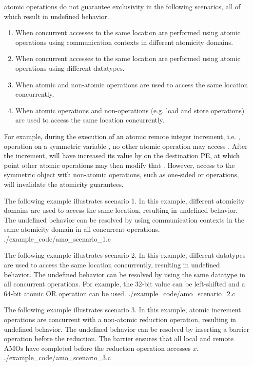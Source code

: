 \openshmem atomic operations do not guarantee exclusivity in the following
scenarios, all of which result in undefined behavior.
\begin{enumerate}
    \item When concurrent accesses to the same location are performed using
        \openshmem atomic operations using communication contexts in
        different atomicity domains.
    \item When concurrent accesses to the same location are performed using
        \openshmem atomic operations using different datatypes.
    \item When atomic and non-atomic \openshmem operations are used to access
        the same location concurrently.
    \item When \openshmem atomic operations and non-\openshmem operations (e.g.
        load and store operations) are used to access the same location
        concurrently.
\end{enumerate}
For example, during the execution of an atomic remote integer increment, i.e. ,
operation on a symmetric variable , no other \openshmem atomic operation
may access .  After the increment,  will have increased its value
by  on the destination \ac{PE}, at which point other atomic operations
may then modify that .  However, access to the symmetric object 
with non-atomic operations, such as one-sided  or  operations,
will invalidate the atomicity guarantees.

\cexample
    {
      The following \CorCpp example illustrates scenario 1.
      In this example, different atomicity domains are used to access
      the same location, resulting in undefined behavior.
      The undefined behavior can be resolved by using communication
      contexts in the same atomicity domain in all concurrent operations.
    } {./example_code/amo_scenario_1.c}

\cexample
    {The following \CorCpp example illustrates scenario 2.  In this example,
    different datatypes are used to access the same location concurrently,
    resulting in undefined behavior.  The undefined behavior can be resolved by
    using the same datatype in all concurrent operations.  For example, the
    32-bit value can be left-shifted and a 64-bit atomic OR operation can be
    used.}
    {./example_code/amo_scenario_2.c}

\cexample
    {The following \CorCpp example illustrates scenario 3.  In this example,
    atomic increment operations are concurrent with a non-atomic reduction
    operation, resulting in undefined behavior.  The undefined behavior can be
    resolved by inserting a barrier operation before the reduction.  The
    barrier ensures that all local and remote AMOs have completed before the
    reduction operation accesses $x$.}
    {./example_code/amo_scenario_3.c}

